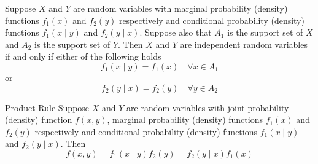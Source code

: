 \begin{Theorem}{}{}
    Suppose $ X $ and $ Y $ are random variables
    with marginal probability (density) functions
    $ f_1(x) $ and $ f_2(y) $ respectively
    and conditional probability (density) functions
    $ f_1(x\mid y) $ and $ f_2(y\mid x) $.
    Suppose also that $ A_1 $ is the support set of $ X $
    and $ A_2 $ is the support set of $ Y $. Then
    $ X $ and $ Y $ are independent random variables if and only if
    either of the following holds
    \[ f_1(x\mid y)=f_1(x) \quad \forall x\in A_1\]
    or
    \[ f_2(y\mid x)=f_2(y) \quad \forall y\in A_2 \]
\end{Theorem}
\begin{Theorem}{Product Rule}{}
    Suppose $ X $ and $ Y $ are random variables
    with joint probability (density) function
    $ f(x,y) $, marginal probability (density) functions
    $ f_1(x) $ and $ f_2(y) $ respectively
    and conditional probability (density) functions
    $ f_1(x\mid y) $ and $ f_2(y\mid x) $. Then
    \[ f(x,y)=f_1(x\mid y)f_2(y)=f_2(y\mid x)f_1(x)  \]
\end{Theorem}
